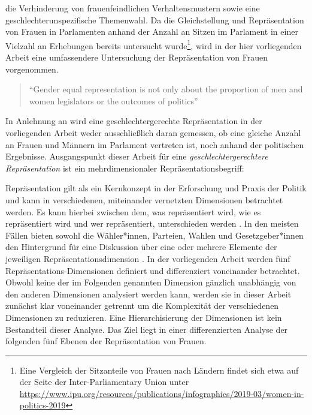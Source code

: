 \documentclass[12pt, 
    twoside=false, 
    bibliography=totoc, 
    numbers=endperiod, 
    headings=normal, 
    toc=chapterentrydotfill
    ]{scrbook}
\begin{document}
die Verhinderung von frauenfeindlichen Verhaltensmustern sowie eine geschlechterunspezifische Themenwahl. Da die Gleichstellung und Repräsentation von Frauen in Parlamenten anhand der Anzahl an Sitzen im Parlament in einer Vielzahl an Erhebungen bereits untersucht wurde\footnote{Eine Vergleich der Sitzanteile von Frauen nach Ländern findet sich etwa auf der Seite der Inter-Parliamentary Union unter \url{https://www.ipu.org/resources/publications/infographics/2019-03/women-in-politics-2019}}, wird in der hier vorliegenden Arbeit eine umfassendere Untersuchung der Repräsentation von Frauen vorgenommen. 

\citereset
\begin{quote}
     \enquote{Gender equal representation is not only about the proportion of men and women legislators or the outcomes of politics}\parencite[197]{erikson_2018}
 \end{quote}

In Anlehnung an \textcite{erikson_2018} wird eine geschlechtergerechte Repräsentation in der vorliegenden Arbeit weder ausschließlich daran gemessen, ob eine gleiche Anzahl an Frauen und Männern im Parlament vertreten ist, noch anhand der politischen Ergebnisse. Ausgangspunkt dieser Arbeit für eine \emph{geschlechtergerechtere Repräsentation} ist ein mehrdimensionaler Repräsentationsbegriff:

Repräsentation gilt als ein Kernkonzept in der Erforschung und Praxis der Politik und kann in verschiedenen, miteinander vernetzten Dimensionen betrachtet werden. Es kann hierbei zwischen dem, was repräsentiert wird, wie es repräsentiert wird und wer repräsentiert, unterschieden werden \parencite[557]{galligan_2007}. In den meisten Fällen bieten sowohl die Wähler*innen, Parteien, Wahlen und Gesetzgeber*innen den Hintergrund für eine Diskussion über eine oder mehrere Elemente der jeweiligen Repräsentationsdimension \parencite[557]{galligan_2007}.
In der vorliegenden Arbeit werden fünf Repräsentations-Dimensionen definiert und differenziert voneinander betrachtet. Obwohl keine der im Folgenden genannten Dimension gänzlich unabhängig von den anderen Dimensionen analysiert werden kann, werden sie in dieser Arbeit zunächst klar voneinander getrennt um die Komplexität der verschiedenen Dimensionen zu reduzieren. Eine Hierarchisierung der Dimensionen ist kein Bestandteil dieser Analyse. Das Ziel liegt in einer differenzierten Analyse der folgenden fünf Ebenen der Repräsentation von Frauen.
\end{document}
